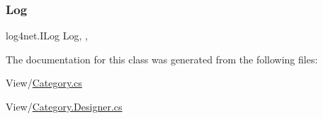 \subsubsection{\texorpdfstring{Log}{Log}}
{\footnotesize\ttfamily log4net.\+I\+Log Log\hspace{0.3cm}{\ttfamily [static]}, {\ttfamily [get]}, {}}



The documentation for this class was generated from the following files\+:\begin{DoxyCompactItemize}
\item 
View/\hyperlink{View_2Category_8cs}{Category.\+cs}\item 
View/\hyperlink{Category_8Designer_8cs}{Category.\+Designer.\+cs}\end{DoxyCompactItemize}
